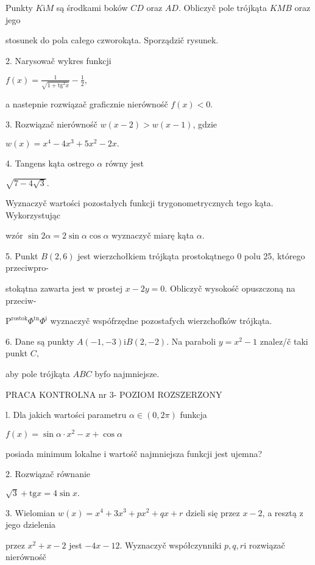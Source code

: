 \documentclass[a4paper,12pt]{article}
\begin{document}
Punkty $K\mathrm{i}M$ są środkami boków $CD$ oraz $AD$. Obliczyč pole trójkąta $KMB$ oraz jego

stosunek do pola całego czworokąta. Sporządzič rysunek.

2. Narysowač wykres funkcji

$f(x)=\displaystyle \frac{1}{\sqrt{1+\mathrm{t}\mathrm{g}^{2}x}}-\frac{1}{2},$

a nastepnie rozwiązač graficznie nierównośč $f(x)<0.$

3. Rozwiązač nierównośč $w(x-2)>w(x-1)$, gdzie

$w(x)=x^{4}-4x^{3}+5x^{2}-2x.$

4. Tangens kąta ostrego $\alpha$ równy jest

$\sqrt{7-4\sqrt{3}}.$

Wyznaczyč wartości pozostałych funkcji trygonometrycznych tego kąta. Wykorzystując

wzór $\sin 2\alpha=2\sin\alpha\cos\alpha$ wyznaczyč miarę kąta $\alpha.$

5. Punkt $B(2,6)$ jest wierzchołkiem trójkąta prostokątnego $0$ polu 25, którego przeciwpro-

stokątna zawarta jest $\mathrm{w}$ prostej $x-2y=0$. Obliczyč wysokośč opuszczoną na przeciw-

$\mathrm{P}^{\mathrm{r}\mathrm{o}\mathrm{s}\mathrm{t}\mathrm{o}\mathrm{k}}\Phi^{\mathrm{t}\mathrm{n}}\Phi^{\mathrm{i}}$ wyznaczyč wspófrzędne pozostafych wierzchofków trójkąta.

6. Dane są punkty $A(-1,-3) \mathrm{i}B(2,-2)$. Na paraboli $y=x^{2}-1$ znalez/č taki punkt $C,$

aby pole trójkąta $ABC$ byfo najmniejsze.





PRACA KONTROLNA nr 3- POZIOM ROZSZERZONY

l. Dla jakich wartości parametru $\alpha\in(0,2\pi)$ funkcja

$ f(x)=\sin\alpha\cdot x^{2}-x+\cos\alpha$

posiada minimum lokalne $\mathrm{i}$ wartośč najmniejsza funkcji jest ujemna?

2. Rozwiązač równanie

$\sqrt{3}+\mathrm{t}\mathrm{g}x=4\sin x.$

3. Wielomian $w(x)=x^{4}+3x^{3}+px^{2}+qx+r$ dzieli się przez $x-2$, a resztą $\mathrm{z}$ jego dzielenia

przez $x^{2}+x-2$ jest $-4x-12$. Wyznaczyč współczynniki $p, q, r\mathrm{i}$ rozwiązač nierównośč
\end{document}

